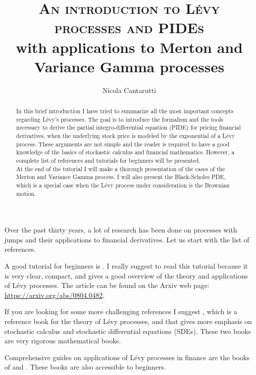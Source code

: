 \documentclass[a4paper,10pt]{article}
\title{\textsc{An introduction to Lévy processes and PIDEs}\\ \small with applications to Merton and Variance Gamma processes}
\author{ Nicola Cantarutti }
\begin{document}
\maketitle

\begin{abstract}
In this brief introduction I have tried to summarize all the most important concepts regarding Lévy's processes.
The goal is to introduce the formalism and the tools necessary to derive the partial integro-differential equation (PIDE) 
for pricing financial derivatives, when the underlying stock price is modeled by the exponential of a Lévy process.
These arguments are not simple and the reader is required to have a good knowledge of the basics of stochastic calculus and financial mathematics.
However, a complete list of references and tutorials for beginners will be presented.\\
At the end of the tutorial I will make a thorough presentation of the cases of the Merton and Variance Gamma process. I will also present the Black-Scholes PDE, which is a 
special case when the Lévy process under consideration is the Brownian motion.
\end{abstract} 



\tableofcontents

\newpage

Over the past thirty years, a lot of research has been done on processes with jumps and their applications to financial derivatives.
Let us start with the list of references.

\noindent
A good tutorial for beginners is \cite{papapa}. I really suggest to read this tutorial because it is very clear, compact, and gives a good overview of the theory and applications
of Lévy processes. The article can be found on the Arxiv web page: \url{https://arxiv.org/abs/0804.0482}.

If you are looking for some more challenging references I suggest 
\cite{Sato}, which is a reference book for the theory of Lévy processes, and 
\cite{Applebaum} that gives more emphasis on stochastic calculus and stochastic differential equations (SDEs). These two books are very rigorous mathematical books.

Comprehensive guides on applications of Lévy processes in finance are the books of 
\cite{Cont} and \cite{Schoutens}. These books are also accessible to beginners.
\end{document}
